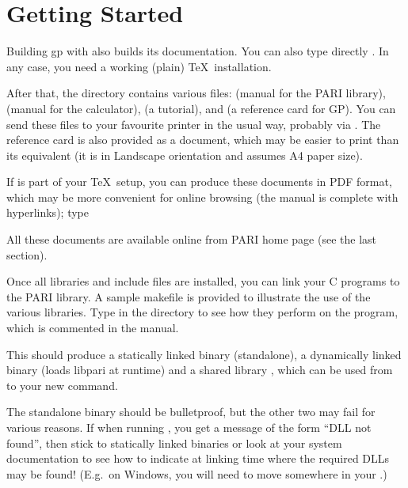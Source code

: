 \section{Getting Started}

 Building gp with  also builds
its documentation. You can also type directly . In any case,
you need a working (plain) \TeX\ installation.

After that, the  directory contains various  files:
 (manual for the PARI library),  (manual
for the  calculator),  (a tutorial), and
 (a reference card for GP). You can send these files to your
favourite printer in the usual way, probably via . The reference
card is also provided as a  document, which may be easier to
print than its  equivalent (it is in Landscape orientation and
assumes A4 paper size).

\noindent If  is part of your \TeX\ setup, you can produce these
documents in PDF format, which may be more convenient for online browsing
(the manual is complete with hyperlinks); type


\noindent All these documents are available online from PARI home page
(see the last section).

 Once all libraries and include files are installed,
you can link your C programs to the PARI library. A sample makefile
 is provided to illustrate the use of the various
libraries. Type  in the  directory to see how
they perform on the  program, which is commented in the
manual.

This should produce a statically linked binary 
(standalone), a dynamically linked binary  (loads libpari
at runtime) and a shared library , which can be used from
 to  your new  command.

The standalone binary should be bulletproof, but the other two may fail
for various reasons. If when running , you get a message
of the form ``DLL not found'', then stick to statically linked binaries
or look at your system documentation to see how to indicate at linking
time where the required DLLs may be found! (E.g.~on Windows, you will
need to move  somewhere in your .)

